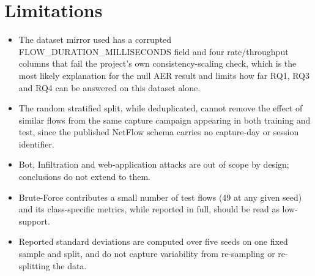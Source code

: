 \documentclass[12pt,a4paper]{report}
\begin{document}
\section{Limitations}
\begin{itemize}\setlength\itemsep{2pt}\item The dataset mirror used has a corrupted FLOW\_DURATION\_MILLISECONDS field and four rate/throughput columns that fail the project's own consistency-scaling check, which is the most likely explanation for the null AER result and limits how far RQ1, RQ3 and RQ4 can be answered on this dataset alone.\end{itemize}
\begin{itemize}\setlength\itemsep{2pt}\item The random stratified split, while deduplicated, cannot remove the effect of similar flows from the same capture campaign appearing in both training and test, since the published NetFlow schema carries no capture-day or session identifier.\end{itemize}
\begin{itemize}\setlength\itemsep{2pt}\item Bot, Infiltration and web-application attacks are out of scope by design; conclusions do not extend to them.\end{itemize}
\begin{itemize}\setlength\itemsep{2pt}\item Brute-Force contributes a small number of test flows (49 at any given seed) and its class-specific metrics, while reported in full, should be read as low-support.\end{itemize}
\begin{itemize}\setlength\itemsep{2pt}\item Reported standard deviations are computed over five seeds on one fixed sample and split, and do not capture variability from re-sampling or re-splitting the data.\end{itemize}
\end{document}
